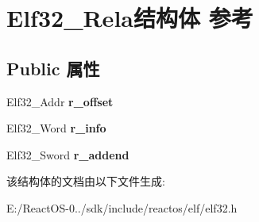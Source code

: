\hypertarget{struct_elf32___rela}{}\section{Elf32\+\_\+\+Rela结构体 参考}
\label{struct_elf32___rela}
\subsection*{Public 属性}
\begin{DoxyCompactItemize}
\item 
\mbox{\label{struct_elf32___rela_aa850a306ee7fa3935a9f8c3d1aae4e51}} 
Elf32\+\_\+\+Addr {\bfseries r\+\_\+offset}
\item 
\mbox{\label{struct_elf32___rela_ac3a79d3f04209c33ddb4c36d07e68a79}} 
Elf32\+\_\+\+Word {\bfseries r\+\_\+info}
\item 
\mbox{\label{struct_elf32___rela_a1952286a900648afb9029c68a8bcea4d}} 
Elf32\+\_\+\+Sword {\bfseries r\+\_\+addend}
\end{DoxyCompactItemize}


该结构体的文档由以下文件生成\+:\begin{DoxyCompactItemize}
\item 
E\+:/\+React\+O\+S-\/0../sdk/include/reactos/elf/elf32.\+h\end{DoxyCompactItemize}
